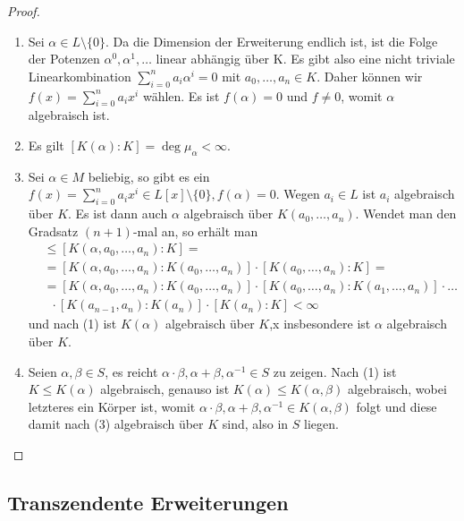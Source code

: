 \begin{proof}{\ }
    \begin{enumerate}
        \item Sei $\alpha \in L \setminus \{0\}$. Da die Dimension der Erweiterung endlich ist, ist die Folge der Potenzen $\alpha^0, \alpha^1, \hdots$ linear abhängig über K. Es gibt also eine nicht triviale Linearkombination $\sum_{i=0}^n a_i \alpha^i = 0$ mit $a_0, \hdots, a_n \in K$. Daher können wir $f(x) = \sum_{i=0}^n a_i x^i$ wählen. Es ist $f(\alpha) = 0$ und $f\neq 0$, womit $\alpha$ algebraisch ist.
        
        \item Es gilt $[K(\alpha) : K] = \deg \mu_\alpha < \infty$.
        
        \item Sei $\alpha \in M$ beliebig, so gibt es ein $f(x) = \sum_{i=0}^n a_i x^i \in L[x]\setminus\{0\}, f(\alpha) = 0$. Wegen $a_i \in L$ ist $a_i$ algebraisch über $K$. Es ist dann auch $\alpha$ algebraisch über $K(a_0, \hdots, a_n)$. Wendet man den Gradsatz $(n+1)$-mal an, so erhält man
        \begin{align*}
            [K(\alpha) : K] &\leq [K(\alpha, a_0, \hdots, a_n) : K] = \\
            &= [K(\alpha, a_0, \hdots, a_n) : K(a_0, \hdots, a_n)] \cdot [K(a_0, \hdots, a_n) : K] = \\
            &= [K(\alpha, a_0, \hdots, a_n) : K(a_0, \hdots, a_n)] \cdot [K(a_0,\hdots ,a_n):K(a_1,\hdots,a_n)] \cdot \hdots \\ &\;\;\cdot [K(a_{n-1},a_n):K(a_n)]\cdot  [K(a_n) : K] < \infty
        \end{align*}
        und nach (1) ist $K(\alpha)$ algebraisch über $K$,x insbesondere ist $\alpha$ algebraisch über $K$.

        \item Seien $\alpha, \beta \in S$, es reicht $\alpha\cdot\beta,\alpha+\beta,\alpha^{-1}\in S$ zu zeigen. Nach (1) ist $K \leq K(\alpha)$ algebraisch, genauso ist $K(\alpha) \leq K(\alpha, \beta)$ algebraisch, wobei letzteres ein Körper ist, womit $\alpha \cdot \beta, \alpha + \beta, \alpha^{-1} \in K(\alpha, \beta)$ folgt und diese damit nach (3) algebraisch über $K$ sind, also in $S$ liegen.
    \end{enumerate}
\end{proof}

\subsection{Transzendente Erweiterungen}

